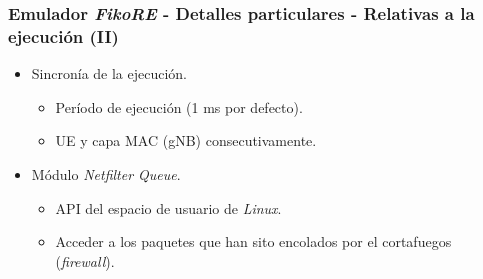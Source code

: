 \documentclass{beamer}
\begin{document}
\begin{frame}
\frametitle{Emulador \textit{FikoRE} - Detalles particulares - Relativas a la ejecución (II)}

\begin{itemize}
\item {
	Sincronía de la ejecución.
	\begin{itemize}
	\item Período de ejecución (1 ms por defecto).
	\item UE y capa MAC (gNB) consecutivamente.
	\end{itemize}
}
\item {
	Módulo \textit{Netfilter Queue}.
	\begin{itemize}
	\item API del espacio de usuario de \textit{Linux}.
	\item Acceder a los paquetes que han sito encolados por el cortafuegos (\textit{firewall}).
	\end{itemize}
}
\end{itemize}
\end{frame}
\end{document}
